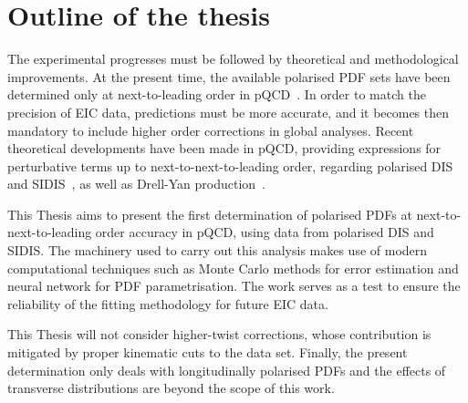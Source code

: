 %
\section{Outline of the thesis}

The experimental progresses must be followed by theoretical and methodological improvements. At the present time, the available polarised PDF sets have been determined only at next-to-leading order in pQCD~\cite{Nocera:2014gqa, deFlorian:2008mr, Ethier:2017zbq}. In order to match the precision of EIC data, predictions must be more accurate, and it becomes then mandatory to include higher order corrections in global analyses. Recent theoretical developments have been made in pQCD, providing expressions for perturbative terms up to next-to-next-to-leading order, regarding polarised DIS~\cite{Zijlstra:1993sh} and SIDIS~\cite{Abele:2021nyo}, as well as Drell-Yan production~\cite{Boughezal:2021wjw}.%

This Thesis aims to present the first determination of polarised PDFs at next-to-next-to-leading order accuracy in pQCD, using data from polarised DIS and SIDIS. The machinery used to carry out this analysis makes use of modern computational techniques such as Monte Carlo methods for error estimation and neural network for PDF parametrisation. The work serves as a test to ensure the reliability of the fitting methodology for future EIC data.%

This Thesis will not consider higher-twist corrections, whose contribution is mitigated by proper kinematic cuts to the data set. Finally, the present determination only deals with longitudinally polarised PDFs and the effects of transverse distributions are beyond the scope of this work.%

